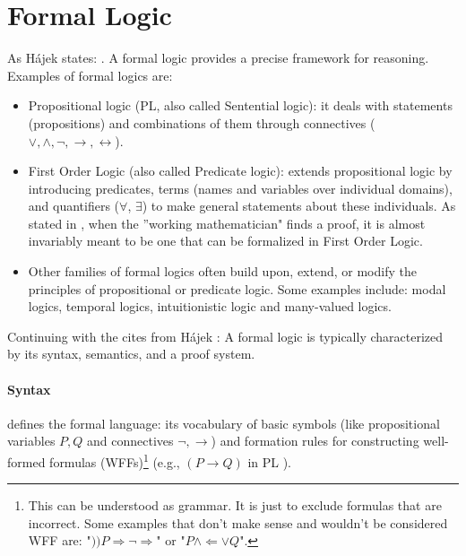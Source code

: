 \section{Formal Logic}
\label{app:form_log}

As Hájek states: \cite[p.1]{Hajek1998}. A formal logic provides a precise framework for reasoning. Examples of formal logics are:

\begin{itemize}
    \item Propositional logic (PL, also called Sentential logic)\cite[Ch.~6]{ConciseLogicBook}: it deals with statements (propositions) and combinations of them through connectives ($ \lor, \land, \neg, \rightarrow, \leftrightarrow$).
    \item First Order Logic (also called Predicate logic)\cite[Ch.~8]{ConciseLogicBook}: extends propositional logic by introducing predicates, terms (names and variables over individual domains), and quantifiers ($\forall$, $\exists$) to make general statements about these individuals. As stated in \cite[p.~67]{MathLogicBook}, when the ''working mathematician" finds a proof, it is almost invariably meant to be one that can be formalized in First Order Logic.
    \item Other families of formal logics often build upon, extend, or modify the principles of propositional or predicate logic. Some examples include: modal logics, temporal logics, intuitionistic logic and many-valued logics.
\end{itemize}

Continuing with the cites from Hájek \cite[p.1]{Hajek1998}:  A formal logic is typically characterized by its syntax, semantics, and a proof system.

\paragraph{Syntax} defines the formal language: its vocabulary of basic symbols (like propositional variables $P, Q$ and connectives $\neg, \rightarrow$) and formation rules for constructing well-formed formulas (WFFs)\footnote{This can be understood as grammar. It is just to exclude formulas that are incorrect. Some examples that don't make sense and wouldn't be considered WFF are: "$))P\Rightarrow \neg\Rightarrow $" or "$P \land \Leftarrow \lor Q$".\cite[Sec.~2.3.3]{Agler2013SymbolicLogic}} (e.g., $(P \rightarrow Q)$ in PL \cite[Sec.~2.3.3]{Agler2013SymbolicLogic}).

